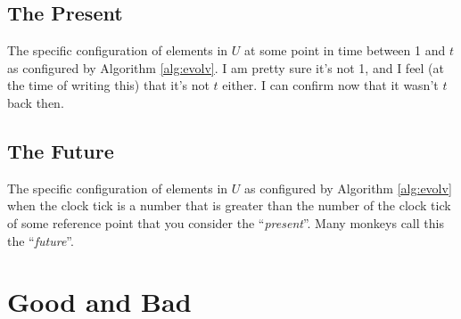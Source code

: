 \documentclass{report}
\begin{document}
\section{The Present}
The specific configuration of elements in $U$ at some point in time between 1
and $t$ as configured by Algorithm \ref{alg:evolv}. I am pretty sure it's not 1,
and I feel (at the time of writing this) that it's not $t$ either. I can
confirm now that it wasn't $t$ back then.

\section{The Future}
The specific configuration of elements in $U$ as configured by Algorithm
\ref{alg:evolv} when the clock tick is a number that is greater than the number
of the clock tick of some reference point that you consider the
``\emph{present}''. Many monkeys call this the ``\emph{future}''.

\chapter{Good and Bad}
\end{document}
